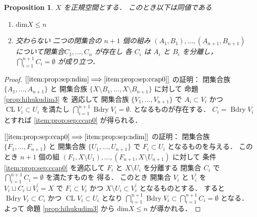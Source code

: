 \documentclass[leqno, a4paper, 12pt]{jsarticle}
\theoremstyle{plain}
\newtheorem{prop}[thm]{Proposition}
\theoremstyle{definition}
\theoremstyle{remark}
\newcommand{\To}{\Longrightarrow}
\DeclareMathOperator{\bd}{\mathrm{Bdry}}
\DeclareMathOperator{\cl}{\mathrm{CL}}
\newcommand{\yodim}{\mathrm{dim}}
\numberwithin{equation}{section}
\begin{document}
\begin{prop}\label{prop:sum:sepn+10}
$X$
を正規空間とする．
このとき以下は同値である
\begin{enumerate}[label=\textup{(\arabic*)}]
\item\label{item:prop:sep:ndim}
$\yodim X\le n$
\item\label{item:prop:sep:ccap0} 
交わらない
二つの閉集合の
$n+1$
個の組み
$(A_{1}, B_{1}), \dots, (A_{n+1}, B_{n+1})$
について閉集合$C_{1}, \dots,  C_{n}$
が存在し
各
$C_{i}$
は
$A_{i}$
と
$B_{i}$
を分離し，
$\bigcap_{i=1}^{n+1}C_{i}=\emptyset$
が成り立つ．


\end{enumerate}
\end{prop}
\begin{proof}
$[\ref{item:prop:sep:ndim}\To \ref{item:prop:sep:ccap0}]$
の証明：
閉集合族
$\{A_{1}, \dots, A_{n+1}\}$
と
開集合族
$\{X\setminus B_{1}, \dots, X\setminus B_{n+1}\}$
に対して
命題
\ref{prop:hihukudim3}
を
適応して
開集合族
$\{V_{1}, \dots, V_{n+1}\}$
で
$A_{i}\subset V_{i}$
かつ
$\cl V_{i}\subset U_{i}$
を満たし
$\bigcap_{i=1}^{n+1}\bd V_{i}=\emptyset$. 
となるものが存在する．
$C_{i}=\bd V_{i}$
とすれば
\ref{item:prop:sep:ccap0}
が得られる．

$[\ref{item:prop:sep:ccap0}\To \ref{item:prop:sep:ndim}]$
の証明：
閉集合族
$\{F_{1}, \dots, F_{n+1}\}$
と
開集合族
$\{U_{1}, \dots, U_{n+1}\}$
で
$F_{i}\subset U_{i}$
となるものを与える．
このとき
$n+1$
個の組
$(F_{1}, X\setminus U_{1}), \dots, (F_{n+1}, X\setminus U_{n+1})$
に対して
条件
\ref{item:prop:sep:ccap0}
を適応して
$F_{i}$
と
$X\setminus U_{i}$
を分離する
閉集合
$C_{i}$
で
$\bigcap_{i=1}^{n+1}C_{i}=\emptyset$
を満たすものを
得る．
このとき
開集合
$V_{i}$
と
$V_{i}^{\prime}$
を
$V_{i}\sqcup C_{i}\sqcup V_{i}^{\prime}=X$
で
$F_{i}\subset V_{i}$
かつ
$X\setminus U_{i}\subset V_{i}^{\prime}$
となるものとする．
すると
$\bd V_{i}\subset C_{i}$
かつ
$\cl V_{i}\subset U_{i}$
となり
$\bigcap_{i=1}^{n+1}\bd V_{i}\subset \bigcap_{i=1}^{n+1}C_{i}=\emptyset$
となる．
よって
命題
\ref{prop:hihukudim3}
から
$\yodim X\le n$
が導かれる．
\end{proof}
\end{document}
